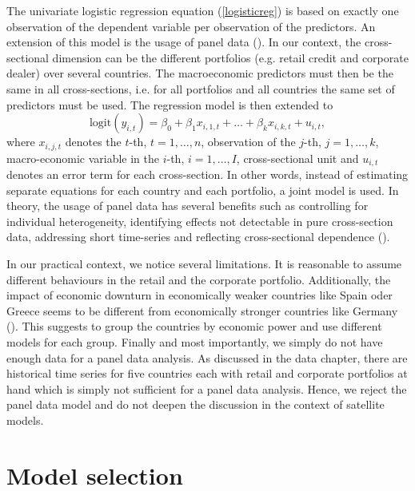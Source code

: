 \documentclass[a4paper, 12pt]{scrreprt}
\newcommand{\logit}{\mathrm{logit}}
\begin{document}
The univariate logistic regression equation (\ref{logisticreg}) is based on exactly one observation of the dependent variable per observation of the predictors. An extension of this model is the usage of panel data (\textcite[chapter 2]{baltagi2008panel}). 
In our context, the cross-sectional dimension can be the different portfolios (e.g. retail credit and corporate dealer) over several countries. The macroeconomic predictors must then be the same in all cross-sections, i.e. for all portfolios and all countries the same set of predictors must be used. 
The regression model is then extended to 
\begin{equation}\label{panel}
\logit(y_{i,t}) = \beta_0 + \beta_1 x_{i,1,t} + \ldots + \beta_k x_{i,k,t} + u_{i,t},
\end{equation}
where $x_{i,j,t}$ denotes the $t$-th, $t=1,\ldots,n$, observation of the $j$-th, $j=1,\ldots,k$, macro-economic variable in the $i$-th, $i=1,\ldots,I$, cross-sectional unit and $u_{i,t}$ denotes an error term for each cross-section.
In other words, instead of estimating separate equations for each country and each portfolio, a joint model is used. In theory, the usage of panel data has several benefits such as controlling for individual heterogeneity, identifying effects not detectable in pure cross-section data, addressing short time-series and reflecting cross-sectional dependence (\textcite[chapter 1.2]{baltagi2008panel}).

\bigskip

In our practical context, we notice several limitations. 
It is reasonable to assume different behaviours in the retail and the corporate portfolio. 
Additionally, the impact of economic downturn in economically weaker countries like Spain oder Greece seems to be different from economically stronger countries like Germany (\textcite[p. 112]{wilson1997wilsonI}). This suggests to group the countries by economic power and use different models for each group.
Finally and most importantly, we simply do not have enough data for a panel data analysis. As discussed in the data chapter, there are historical time series for five countries each with retail and corporate portfolios at hand which is simply not sufficient for a panel data analysis. 
Hence, we reject the panel data model and do not deepen the discussion in the context of satellite models.

\pagebreak

\section{Model selection}\label{section:modelselection}
\end{document}
